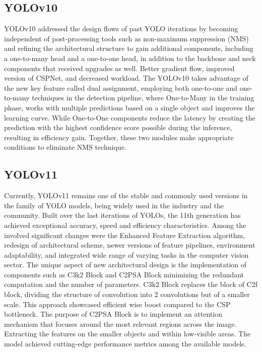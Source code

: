\begin{multicols}{2}
\subsection{YOLOv10}
YOLOv10 addressed the design flows of past YOLO iterations by becoming independent of post-processing tools such as non-maximum suppression (NMS) and refining the architectural structure to gain additional components, including a one-to-many head and a one-to-one head, in addition to the backbone and neck components that received upgrades as well. Better gradient flow, improved version of CSPNet, and decreased workload. The YOLOv10 takes advantage of the new key feature called dual assignment, employing both one-to-one and one-to-many techniques in the detection pipeline, where One-to-Many in the training phase, works with multiple predictions based on a single object and improves the learning curve. While One-to-One components reduce the latency by creating the prediction with the highest confidence score possible during the inference, resulting in efficiency gain. Together, these two modules make appropriate conditions to eliminate NMS technique.

\subsection{YOLOv11}
Currently, YOLOv11 remains one of the stable and commonly used versions in the family of YOLO models, being widely used in the industry and the community. Built over the last iterations of YOLOs, the 11th generation has achieved exceptional accuracy, speed and efficiency characteristics. Among the involved significant changes were the Enhanced Feature Extraction algorithm, redesign of architectural scheme, newer versions of feature pipelines, environment adaptability, and integrated wide range of varying tasks in the computer vision sector. The unique aspect of new architectural design is the implementation of components such as C3k2 Block and C2PSA Block minimizing the redundant computation and the number of parameters. C3k2 Block replaces the block of C2f block, dividing the structure of convolution into 2 convolutions but of a smaller scale. This approach showcased efficient wise boost compared to the CSP bottleneck. The purpose of C2PSA Block is to implement an attention mechanism that focuses around the most relevant regions across the image. Extracting the features on the smaller objects and within low-visible areas.
The model achieved cutting-edge performance metrics among the available models. 


\end{multicols}

